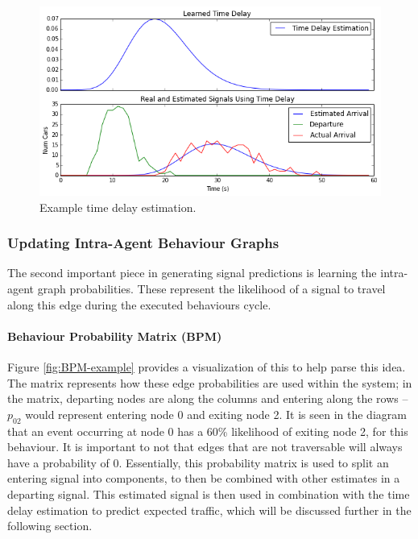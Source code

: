 \documentclass{report}
\begin{document}
\begin{figure}[H]
  \begin{centering}
    \includegraphics[scale=0.75]{figures/time-delay-est.png}
    \caption{Example time delay estimation.}
    \label{fig:time-delay-est}
  \end{centering}
\end{figure}


\subsubsection{Updating Intra-Agent Behaviour Graphs}
The second important piece in generating signal predictions is learning the intra-agent graph probabilities. 
These represent the likelihood of a signal to travel along this edge during the executed behaviours cycle.

\paragraph{Behaviour Probability Matrix (BPM)}
Figure \ref{fig:BPM-example} provides a visualization of this to help parse this idea. 
The matrix represents how these edge probabilities are used within the system; in the matrix, departing nodes are along the columns and entering along the rows -- $p_{02}$ would represent entering node 0 and exiting node 2. 
It is seen in the diagram that an event occurring at node 0 has a 60\% likelihood of exiting node 2, for this behaviour.
 It is important to not that edges that are not traversable will always have a probability of 0. 
Essentially, this probability matrix is used to split an entering signal into components, to then be combined with other estimates in a departing signal. 
This estimated signal is then used in combination with the time delay estimation to predict expected traffic, which will be discussed further in the following section.
\end{document}

